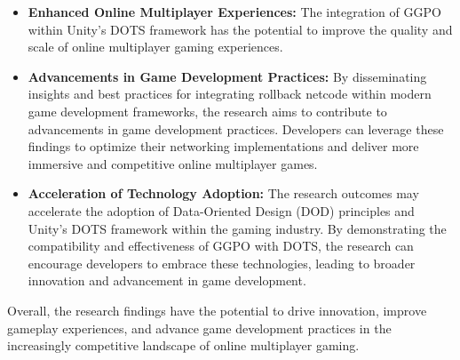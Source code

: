 \begin{itemize}
    \item \textbf{Enhanced Online Multiplayer Experiences:} The integration of GGPO within Unity's DOTS framework has the potential to improve the quality and scale of online multiplayer gaming experiences.
    
    \item \textbf{Advancements in Game Development Practices:} By disseminating insights and best practices for integrating rollback netcode within modern game development frameworks, the research aims to contribute to advancements in game development practices. Developers can leverage these findings to optimize their networking implementations and deliver more immersive and competitive online multiplayer games.
    
    \item \textbf{Acceleration of Technology Adoption:} The research outcomes may accelerate the adoption of Data-Oriented Design (DOD) principles and Unity's DOTS framework within the gaming industry. By demonstrating the compatibility and effectiveness of GGPO with DOTS, the research can encourage developers to embrace these technologies, leading to broader innovation and advancement in game development.
\end{itemize}

Overall, the research findings have the potential to drive innovation, improve gameplay experiences, and advance game development practices in the increasingly competitive landscape of online multiplayer gaming.












